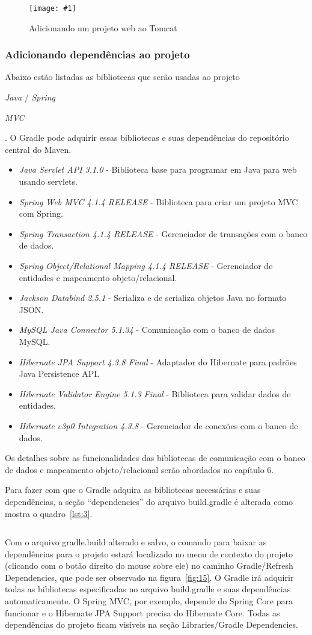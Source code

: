 \documentclass[a4paper,12pt]{article}
\newenvironment{simple}%
{\noindent}%
{\par\noindent}
\newcommand{\spring} {
\lang{Java}/\est{Spring} \sigla{MVC}
}
\newcommand{\figura}[3] {
	\begin{figure}[H]
		\centering
		\texttt{[image: \#1]}
		\caption{#2}
		\label{#3}
	\end{figure}
	\FloatBarrier
}
\newcommand{\est}[1] {
	\textit{#1}
}
\newcommand{\sigla}[1] {
	\textit{#1}
}
\newcommand{\lang}[1] {
	\textit{#1}
}
\newcommand{\lib}[1] {
	\textit{#1}
}
\newcommand{\groovycode}[3] {
	\begin{simple}
	\inputminted[fontsize=\footnotesize]{groovy}{#1}
	\captionof{listing}{#2}
	\label{#3}
	\end{simple}
	\FloatBarrier
}
\begin{document}
\figura{tomcatproject.png}{Adicionando um projeto web ao Tomcat}{fig:14}

\subsubsection{Adicionando dependências ao projeto}

Abaixo estão listadas as bibliotecas que serão usadas ao projeto \spring. O Gradle pode adquirir essas bibliotecas e suas dependências do repositório central do Maven.

\begin{itemize}
  \item \lib{Java Servlet API 3.1.0} - Biblioteca base para programar em Java para web usando servlets.
  \item \lib{Spring Web MVC 4.1.4 RELEASE} - Biblioteca para criar um projeto MVC com Spring.
  \item \lib{Spring Transaction 4.1.4 RELEASE} - Gerenciador de transações com o banco de dados.
  \item \lib{Spring Object/Relational Mapping 4.1.4 RELEASE} - Gerenciador de entidades e mapeamento objeto/relacional.
  \item \lib{Jackson Databind 2.5.1} - Serializa e de serializa objetos Java no formato JSON.
  \item \lib{MySQL Java Connector 5.1.34} - Comunicação com o banco de dados MySQL.
  \item \lib{Hibernate JPA Support 4.3.8 Final} - Adaptador do Hibernate para padrões Java Persistence API.
  \item \lib{Hibernate Validator Engine 5.1.3 Final} - Biblioteca para validar dados de entidades.
  \item \lib{Hibernate c3p0 Integration 4.3.8} - Gerenciador de conexões com o banco de dados.
\end{itemize}

Os detalhes sobre as funcionalidades das bibliotecas de comunicação com o banco de dados e mapeamento objeto/relacional serão abordados no capítulo 6. 

Para fazer com que o Gradle adquira as bibliotecas necessárias e suas dependências, a seção “dependencies” do arquivo build.gradle é alterada como mostra o quadro~\ref{lst:3}.

\groovycode{code/gradledependencies.txt}{Adicionando dependências ao projeto}{lst:3}

Com o arquivo gradle.build alterado e salvo, o comando para baixar as dependências para o projeto estará localizado no menu de contexto do projeto (clicando com o botão direito do mouse sobre ele) no caminho Gradle/Refresh Dependencies, que pode ser observado na figura~\ref{fig:15}. O Gradle irá adquirir todas as bibliotecas especificadas no arquivo build.gradle e suas dependências automaticamente. O Spring MVC, por exemplo, depende do Spring Core para funcionar e o Hibernate JPA Support precisa do Hibernate Core. Todas as dependências do projeto ficam visíveis na seção Libraries/Gradle Dependencies.
\end{document}
